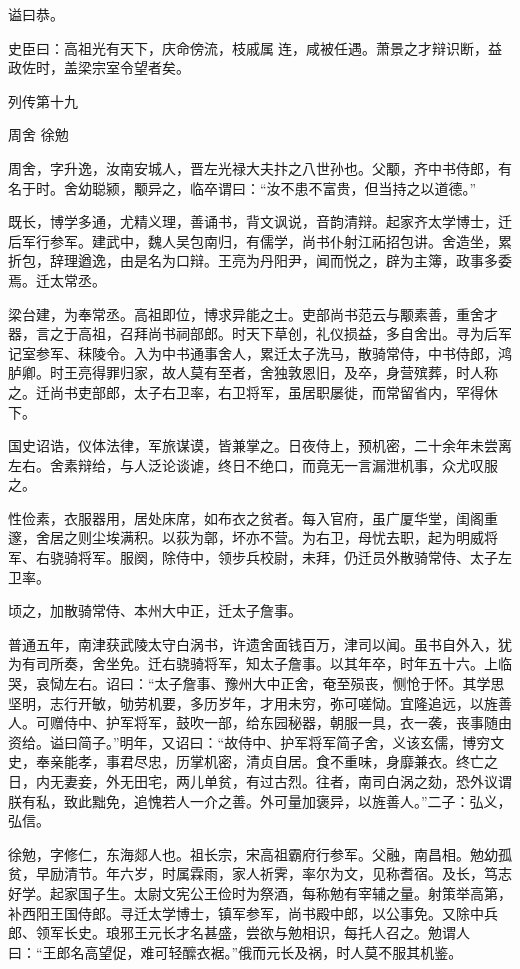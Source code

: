 \documentclass[12pt,UTF8]{ctexbook}
\begin{document}
谥曰恭。

史臣曰：高祖光有天下，庆命傍流，枝戚属连，咸被任遇。萧景之才辩识断，益政佐时，盖梁宗室令望者矣。





列传第十九

周舍 徐勉

周舍，字升逸，汝南安城人，晋左光禄大夫抃之八世孙也。父颙，齐中书侍郎，有名于时。舍幼聪颍，颙异之，临卒谓曰：“汝不患不富贵，但当持之以道德。”

既长，博学多通，尤精义理，善诵书，背文讽说，音韵清辩。起家齐太学博士，迁后军行参军。建武中，魏人吴包南归，有儒学，尚书仆射江祏招包讲。舍造坐，累折包，辞理遒逸，由是名为口辩。王亮为丹阳尹，闻而悦之，辟为主簿，政事多委焉。迁太常丞。

梁台建，为奉常丞。高祖即位，博求异能之士。吏部尚书范云与颙素善，重舍才器，言之于高祖，召拜尚书祠部郎。时天下草创，礼仪损益，多自舍出。寻为后军记室参军、秣陵令。入为中书通事舍人，累迁太子洗马，散骑常侍，中书侍郎，鸿胪卿。时王亮得罪归家，故人莫有至者，舍独敦恩旧，及卒，身营殡葬，时人称之。迁尚书吏部郎，太子右卫率，右卫将军，虽居职屡徙，而常留省内，罕得休下。

国史诏诰，仪体法律，军旅谋谟，皆兼掌之。日夜侍上，预机密，二十余年未尝离左右。舍素辩给，与人泛论谈谑，终日不绝口，而竟无一言漏泄机事，众尤叹服之。

性俭素，衣服器用，居处床席，如布衣之贫者。每入官府，虽广厦华堂，闺阁重邃，舍居之则尘埃满积。以荻为鄣，坏亦不营。为右卫，母忧去职，起为明威将军、右骁骑将军。服阕，除侍中，领步兵校尉，未拜，仍迁员外散骑常侍、太子左卫率。

顷之，加散骑常侍、本州大中正，迁太子詹事。

普通五年，南津获武陵太守白涡书，许遗舍面钱百万，津司以闻。虽书自外入，犹为有司所奏，舍坐免。迁右骁骑将军，知太子詹事。以其年卒，时年五十六。上临哭，哀恸左右。诏曰：“太子詹事、豫州大中正舍，奄至殒丧，恻怆于怀。其学思坚明，志行开敏，劬劳机要，多历岁年，才用未穷，弥可嗟恸。宜隆追远，以旌善人。可赠侍中、护军将军，鼓吹一部，给东园秘器，朝服一具，衣一袭，丧事随由资给。谥曰简子。”明年，又诏曰：“故侍中、护军将军简子舍，义该玄儒，博穷文史，奉亲能孝，事君尽忠，历掌机密，清贞自居。食不重味，身靡兼衣。终亡之日，内无妻妾，外无田宅，两儿单贫，有过古烈。往者，南司白涡之劾，恐外议谓朕有私，致此黜免，追愧若人一介之善。外可量加褒异，以旌善人。”二子：弘义，弘信。

徐勉，字修仁，东海郯人也。祖长宗，宋高祖霸府行参军。父融，南昌相。勉幼孤贫，早励清节。年六岁，时属霖雨，家人祈霁，率尔为文，见称耆宿。及长，笃志好学。起家国子生。太尉文宪公王俭时为祭酒，每称勉有宰辅之量。射策举高第，补西阳王国侍郎。寻迁太学博士，镇军参军，尚书殿中郎，以公事免。又除中兵郎、领军长史。琅邪王元长才名甚盛，尝欲与勉相识，每托人召之。勉谓人曰：“王郎名高望促，难可轻醿衣裾。”俄而元长及祸，时人莫不服其机鉴。
\end{document}
